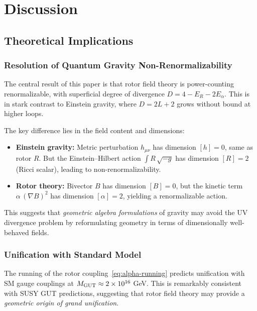 \documentclass[11pt,a4paper]{article}
\numberwithin{equation}{section}
\theoremstyle{plain}
\theoremstyle{definition}
\theoremstyle{remark}
\begin{document}
\vspace{1em}

\section{Discussion}\label{sec:discussion}

\subsection{Theoretical Implications}

\subsubsection{Resolution of Quantum Gravity Non-Renormalizability}

The central result of this paper is that rotor field theory is power-counting renormalizable, with superficial degree of divergence $D=4-E_R-2E_\alpha$. This is in stark contrast to Einstein gravity, where $D=2L+2$ grows without bound at higher loops.

The key difference lies in the field content and dimensions:
\begin{itemize}
  \item \textbf{Einstein gravity:} Metric perturbation $h_{\mu\nu}$ has dimension $[h]=0$, same as rotor $R$. But the Einstein--Hilbert action $\int R\,\sqrt{-g}$ has dimension $[R]=2$ (Ricci scalar), leading to non-renormalizability.
  \item \textbf{Rotor theory:} Bivector $B$ has dimension $[B]=0$, but the kinetic term $\alpha\,(\nabla B)^2$ has dimension $[\alpha]=2$, yielding a renormalizable action.
\end{itemize}

This suggests that \emph{geometric algebra formulations} of gravity may avoid the UV divergence problem by reformulating geometry in terms of dimensionally well-behaved fields.

\subsubsection{Unification with Standard Model}

The running of the rotor coupling~\eqref{eq:alpha-running} predicts unification with SM gauge couplings at $M_{\rm GUT}\approx 2\times 10^{16}$ GeV. This is remarkably consistent with SUSY GUT predictions, suggesting that rotor field theory may provide a \emph{geometric origin of grand unification}.
\end{document}
